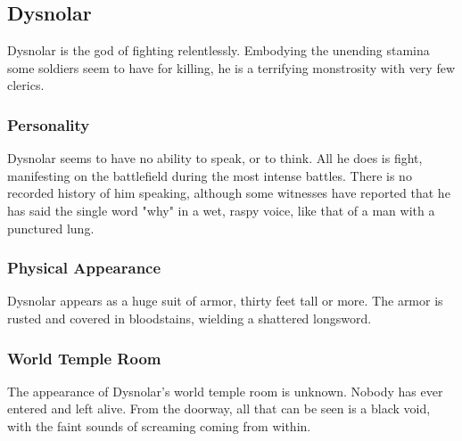 \subsection*{Dysnolar}
\begin{goddesc}
\end{goddesc}
Dysnolar is the god of fighting relentlessly.
Embodying the unending stamina some soldiers seem to have for killing, he is a terrifying monstrosity with very few clerics.

\subsubsection*{Personality}
Dysnolar seems to have no ability to speak, or to think.
All he does is fight, manifesting on the battlefield during the most intense battles.
There is no recorded history of him speaking, although some witnesses have reported that he has said the single word "why" in a wet, raspy voice, like that of a man with a punctured lung.

\subsubsection*{Physical Appearance}
Dysnolar appears as a huge suit of armor, thirty feet tall or more.
The armor is rusted and covered in bloodstains, wielding a shattered longsword.

\subsubsection*{World Temple Room}
The appearance of Dysnolar's world temple room is unknown.
Nobody has ever entered and left alive.
From the doorway, all that can be seen is a black void, with the faint sounds of screaming coming from within.